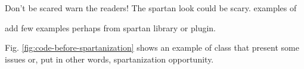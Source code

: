Don't be scared warn the readers!
The spartan look could be scary.
examples of  

add few examples perhaps from spartan library or plugin. 

Fig. \ref{fig:code-before-spartanization} shows an example of class 
that present some issues or, put in other words, spartanization opportunity. 



